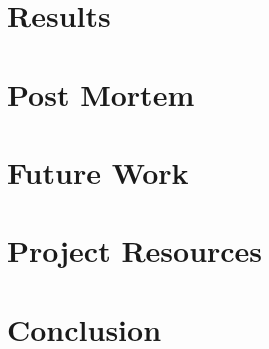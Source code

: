 \documentclass[hidelinks, 12pt]{article} %
\begin{document}
		\section{Results}
		\label{Results}
		
		\pagebreak
		
		\newpage
		\section{Post Mortem}
		\label{Post Mortem}
		
		\pagebreak
		
		\newpage
		\section{Future Work}
		\label{Future Work}
		
		\pagebreak
		
		\newpage
		\section{Project Resources}
		\label{Project Resources}
		
		\pagebreak
		
		\newpage
		\section{Conclusion}
		\label{Conclusion}
		
		\pagebreak
		
		\newpage
		\printglossary[type=\acronymtype]
		\pagebreak
		
\end{document}
